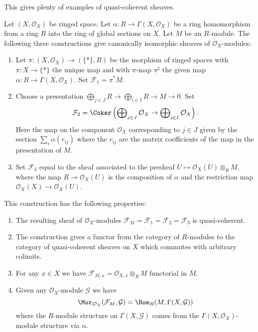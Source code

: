 \noindent
This gives plenty of examples of quasi-coherent sheaves.

\begin{lemma}
\label{lemma-construct-quasi-coherent-sheaves}
Let $(X, \mathcal{O}_X)$ be ringed space.
Let $\alpha : R \to \Gamma(X, \mathcal{O}_X)$ be a ring homomorphism from
a ring $R$ into the ring of global sections on $X$.
Let $M$ be an $R$-module.
The following three constructions give canonically isomorphic
sheaves of $\mathcal{O}_X$-modules:
\begin{enumerate}
\item Let $\pi : (X, \mathcal{O}_X) \longrightarrow (\{*\}, R)$
be the morphism of ringed spaces with $\pi : X \to \{*\}$
the unique map and with $\pi$-map $\pi^\sharp$ the given map
$\alpha : R \to \Gamma(X, \mathcal{O}_X)$. Set $\mathcal{F}_1 = \pi^*M$.
\item Choose a presentation
$\bigoplus_{j \in J} R \to \bigoplus_{i \in I} R \to M \to 0$.
Set
$$
\mathcal{F}_2 = \Coker\left(
\bigoplus\nolimits_{j \in J} \mathcal{O}_X
\to
\bigoplus\nolimits_{i \in I} \mathcal{O}_X
\right).
$$
Here the map on the component $\mathcal{O}_X$ corresponding to $j \in J$
given by the section $\sum_i \alpha(r_{ij})$ where the $r_{ij}$
are the matrix coefficients of the map in the presentation of $M$.
\item Set $\mathcal{F}_3$ equal to the sheaf associated to the presheaf
$U \mapsto \mathcal{O}_X(U) \otimes_R M$, where the map
$R \to \mathcal{O}_X(U)$ is the composition of $\alpha$ and
the restriction map $\mathcal{O}_X(X) \to \mathcal{O}_X(U)$.
\end{enumerate}
This construction has the following properties:
\begin{enumerate}
\item The resulting sheaf of $\mathcal{O}_X$-modules
$\mathcal{F}_M = \mathcal{F}_1 = \mathcal{F}_2 = \mathcal{F}_3$
is quasi-coherent.
\item The construction gives a functor from
the category of $R$-modules to the category of quasi-coherent
sheaves on $X$ which commutes with arbitrary colimits.
\item For any $x \in X$ we have
$\mathcal{F}_{M, x} = \mathcal{O}_{X, x} \otimes_R M$
functorial in $M$.
\item Given any $\mathcal{O}_X$-module
$\mathcal{G}$ we have
$$
\Mor_{\mathcal{O}_X}(\mathcal{F}_M, \mathcal{G})
=
\Hom_R(M, \Gamma(X, \mathcal{G}))
$$
where the $R$-module structure on $\Gamma(X, \mathcal{G})$
comes from the $\Gamma(X, \mathcal{O}_X)$-module structure via
$\alpha$.
\end{enumerate}
\end{lemma}


